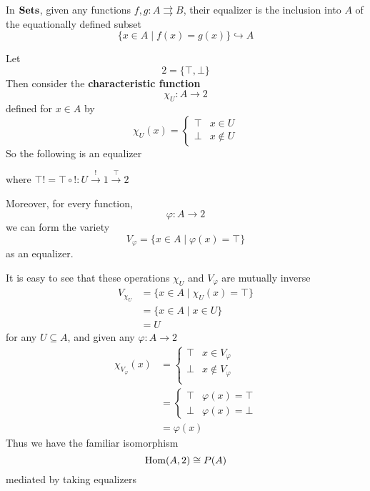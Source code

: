 \documentclass[11pt]{article}
\begin{document}
\begin{examplle}[]
In \(\operatorname{\textbf{Sets}}\), given any functions \(f,g:A\rightrightarrows B\), their
equalizer is the inclusion into \(A\) of the equationally defined subset
\begin{equation*}
\{x\in A\mid f(x)=g(x)\}\hookrightarrow A
\end{equation*}

Let
\begin{equation*}
2=\{\top,\bot\}
\end{equation*}
Then consider the \textbf{characteristic function}
\begin{equation*}
\chi_U:A\to 2
\end{equation*}
defined for \(x\in A\) by
\begin{equation*}
\chi_U(x)=
\begin{cases}
\top&x\in U\\
\bot&x\not\in U
\end{cases}
\end{equation*}
So the following is an equalizer
\begin{center}\end{center}

where \(\top!=\top\circ!:U\xrightarrow{!}1\xrightarrow{\top}2\)

Moreover, for every function,
\begin{equation*}
\varphi:A\to 2
\end{equation*}
we can form the variety
\begin{equation*}
V_{\varphi}=\{x\in A\mid \varphi(x)=\top\}
\end{equation*}
as an equalizer.

It is easy to see that these operations \(\chi_U\) and \(V_\varphi\) are
mutually inverse
\begin{align*}
 V_{\chi_U}&=\{x\in A\mid \chi_U(x)=\top\}\\
 &=\{x\in A\mid x\in U\}\\
 &=U
\end{align*}
for any \(U\subseteq A\), and given any \(\varphi:A\to2\)
\begin{align*}
\chi_{V_\varphi}(x)&=
\begin{cases}
\top&x\in V_\varphi\\
\bot&x\not\in V_\varphi\\
\end{cases}\\
&=
\begin{cases}
\top&\varphi(x)=\top\\
\bot&\varphi(x)=\bot
\end{cases}\\
&=\varphi(x)
\end{align*}
Thus we have the familiar isomorphism
\begin{equation*}
\operatorname{Hom}(A,2)\cong P(A)
\end{equation*}
mediated by taking equalizers
\end{examplle}
\end{document}
